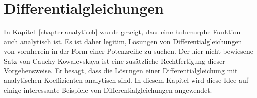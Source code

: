 %
%
%
\chapter{Differentialgleichungen
\label{chapter:differentialgleichungen}}
In Kapitel~\ref{chapter:analytisch} wurde gezeigt, dass eine holomorphe
Funktion auch analytisch ist.
Es ist daher legitim, Lösungen von Differentialgleichungen von 
vornherein in der Form einer Potenzreihe zu suchen.
Der hier nicht bewiesene Satz von Cauchy-Kowalevskaya ist eine
zusätzliche Rechtfertigung dieser Vorgehensweise.
Er besagt, dass die Lösungen einer Differentialgleichung mit analytischen
Koeffizienten analytisch sind.
In diesem Kapitel wird diese Idee auf einige interessante Beispiele
von Differentialgleichungen angewendet.





\uebungsabschnitt

\begin{uebungsaufgaben}
\end{uebungsaufgaben}
\enduebungsabschnitt

